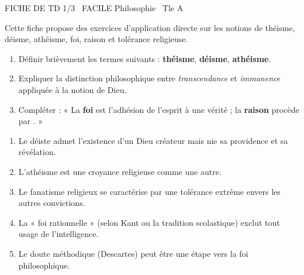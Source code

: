 \documentclass[11pt]{article}
\begin{document}
\begin{tcolorbox}[enhanced,colback=popink,colframe=popink,arc=10pt,boxrule=0pt,left=12pt,right=12pt,top=9pt,bottom=9pt]
{\color{white}\popxbold\small FICHE DE TD 1/3 \textbullet\ FACILE \hfill Philosophie \textbullet\ Tle A\par}
\end{tcolorbox}
\vspace{4pt}
Cette fiche propose des exercices d'application directe sur les notions de théisme, déisme, athéisme, foi, raison et tolérance religieuse.

\begin{exercice}
\begin{enumerate}
    \item Définir brièvement les termes suivants : \textbf{théisme}, \textbf{déisme}, \textbf{athéisme}.
    \item Expliquer la distinction philosophique entre \textit{transcendance} et \textit{immanence} appliquée à la notion de Dieu.
    \item Compléter : « La \textbf{foi} est l'adhésion de l'esprit à une vérité \underline{\hspace{4cm}} ; la \textbf{raison} procède par \underline{\hspace{4cm}}. »
\end{enumerate}
\end{exercice}

\begin{exercice}
\begin{enumerate}
    \item Le déiste admet l'existence d'un Dieu créateur mais nie sa providence et sa révélation.
    \item L'athéisme est une croyance religieuse comme une autre.
    \item Le fanatisme religieux se caractérise par une tolérance extrême envers les autres convictions.
    \item La « foi rationnelle » (selon Kant ou la tradition scolastique) exclut tout usage de l'intelligence.
    \item Le doute méthodique (Descartes) peut être une étape vers la foi philosophique.
\end{enumerate}
\end{exercice}
\end{document}
